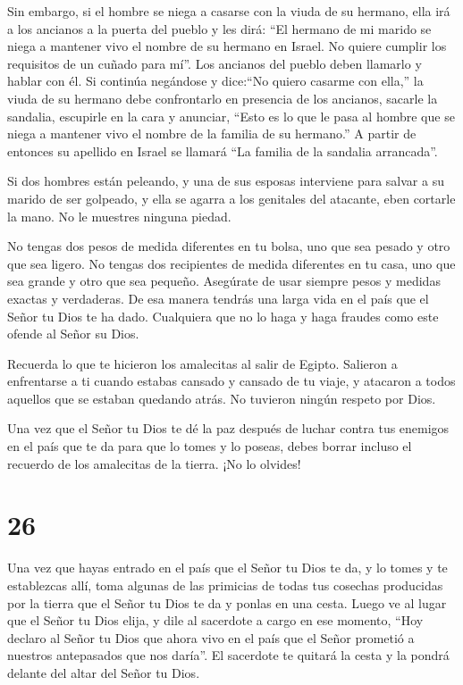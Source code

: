  Sin embargo, si el hombre se niega a casarse con la viuda
de su hermano, ella irá a los ancianos a la puerta del pueblo y les
dirá: ``El hermano de mi marido se niega a mantener vivo el nombre de su
hermano en Israel. No quiere cumplir los requisitos de un cuñado para
mí''.  Los ancianos del pueblo deben llamarlo y hablar con
él. Si continúa negándose y dice:``No quiero casarme con ella,''
 la viuda de su hermano debe confrontarlo en presencia de
los ancianos, sacarle la sandalia, escupirle en la cara y anunciar,
``Esto es lo que le pasa al hombre que se niega a mantener vivo el
nombre de la familia de su hermano.''  A partir de entonces
su apellido en Israel se llamará ``La familia de la sandalia
arrancada''.

 Si dos hombres están peleando, y una de sus esposas
interviene para salvar a su marido de ser golpeado, y ella se agarra a
los genitales del atacante,  eben cortarle la mano. No le
muestres ninguna piedad.

 No tengas dos pesos de medida diferentes en tu bolsa, uno
que sea pesado y otro que sea ligero.  No tengas dos
recipientes de medida diferentes en tu casa, uno que sea grande y otro
que sea pequeño.  Asegúrate de usar siempre pesos y medidas
exactas y verdaderas. De esa manera tendrás una larga vida en el país
que el Señor tu Dios te ha dado.  Cualquiera que no lo haga
y haga fraudes como este ofende al Señor su Dios.

 Recuerda lo que te hicieron los amalecitas al salir de
Egipto.  Salieron a enfrentarse a ti cuando estabas cansado
y cansado de tu viaje, y atacaron a todos aquellos que se estaban
quedando atrás. No tuvieron ningún respeto por Dios.

 Una vez que el Señor tu Dios te dé la paz después de
luchar contra tus enemigos en el país que te da para que lo tomes y lo
poseas, debes borrar incluso el recuerdo de los amalecitas de la tierra.
¡No lo olvides!

\hypertarget{section-25}{%
\section{26}\label{section-25}}

 Una vez que hayas entrado en el país que el Señor tu Dios
te da, y lo tomes y te establezcas allí,  toma algunas de
las primicias de todas tus cosechas producidas por la tierra que el
Señor tu Dios te da y ponlas en una cesta. Luego ve al lugar que el
Señor tu Dios elija,  y dile al sacerdote a cargo en ese
momento, ``Hoy declaro al Señor tu Dios que ahora vivo en el país que el
Señor prometió a nuestros antepasados que nos daría''.  El
sacerdote te quitará la cesta y la pondrá delante del altar del Señor tu
Dios.


